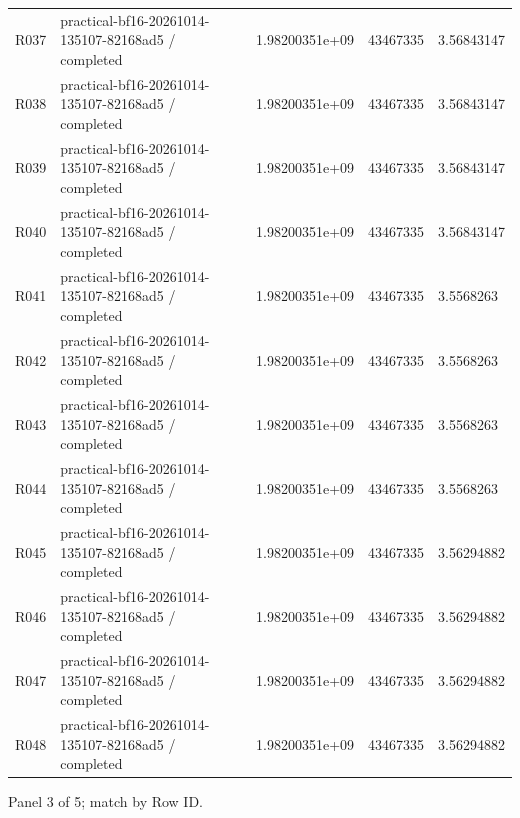 \documentclass[10pt]{article}
\begin{document}
{\begin{longtable}{p{}p{}p{}p{}p{}}
R037 & practical-bf16-20261014-135107-82168ad5 / completed & 1.98200351e+09 & 43467335 & 3.56843147 \\
R038 & practical-bf16-20261014-135107-82168ad5 / completed & 1.98200351e+09 & 43467335 & 3.56843147 \\
R039 & practical-bf16-20261014-135107-82168ad5 / completed & 1.98200351e+09 & 43467335 & 3.56843147 \\
R040 & practical-bf16-20261014-135107-82168ad5 / completed & 1.98200351e+09 & 43467335 & 3.56843147 \\
R041 & practical-bf16-20261014-135107-82168ad5 / completed & 1.98200351e+09 & 43467335 & 3.5568263 \\
R042 & practical-bf16-20261014-135107-82168ad5 / completed & 1.98200351e+09 & 43467335 & 3.5568263 \\
R043 & practical-bf16-20261014-135107-82168ad5 / completed & 1.98200351e+09 & 43467335 & 3.5568263 \\
R044 & practical-bf16-20261014-135107-82168ad5 / completed & 1.98200351e+09 & 43467335 & 3.5568263 \\
R045 & practical-bf16-20261014-135107-82168ad5 / completed & 1.98200351e+09 & 43467335 & 3.56294882 \\
R046 & practical-bf16-20261014-135107-82168ad5 / completed & 1.98200351e+09 & 43467335 & 3.56294882 \\
R047 & practical-bf16-20261014-135107-82168ad5 / completed & 1.98200351e+09 & 43467335 & 3.56294882 \\
R048 & practical-bf16-20261014-135107-82168ad5 / completed & 1.98200351e+09 & 43467335 & 3.56294882 \\
\end{longtable}}
\par\noindent Panel 3 of 5; match by Row ID.
\end{document}
